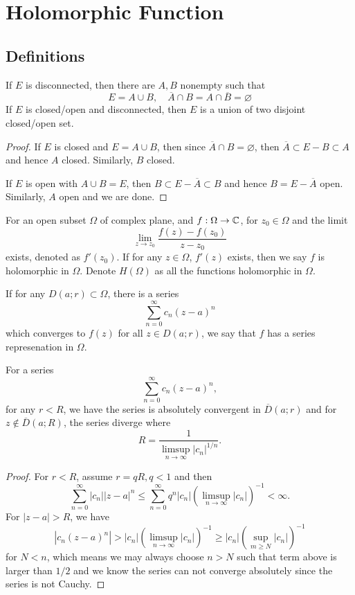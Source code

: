 \section{Holomorphic Function}

\subsection{Definitions}

\begin{definition}
    [Disconnection] If $E$ is disconnected, then there are $A,B$ nonempty such that
    \[
    E = A\cup B,\quad \overline{A} \cap B = A\cap \overline{B} = \varnothing
    \]
    If $E$ is closed/open and disconnected, then $E$ is a union of two disjoint closed/open set.
\end{definition}
\begin{proof}
    If $E$ is closed and $E = A \cup B$, then since $\overline{A} \cap B = \varnothing$, then $\overline{A} \subset E - B \subset A$ and hence $A$ closed. Similarly, $B$ closed.\par
    If $E$ is open with $A\cup B = E$, then $ B \subset E - \overline{A} \subset B$ and hence $B = E - \overline{A}$ open. Similarly, $A$ open and we are done.
\end{proof}

\begin{definition}
     For an open subset $\Omega$ of complex plane, and $f: \Omega \to \mathbb{C}$, for $z_0 \in \Omega$ and the limit
    \[
    \lim_{z\to z_0} \dfrac{f(z)-f(z_0)}{z-z_0}
    \]
    exists, denoted as $f'(z_0)$. If for any $z\in\Omega$, $f'(z)$ exists, then we say $f$ is holomorphic in $\Omega$. Denote $H(\Omega)$ as all the functions holomorphic in $\Omega$.
\end{definition}

\begin{definition}
    [Series] If for any $D(a;r) \subset \Omega$, there is a series
    \[
    \sum\limits_{n=0}^{\infty} c_n(z-a)^n
    \]
    which converges to $f(z)$ for all $z \in D(a;r)$, we say that $f$ has a series represenation in $\Omega$.
\end{definition}

\begin{theorem}
\label{thm: convergent-radius}
    For a series
    \[
    \sum\limits_{n=0}^{\infty} c_n(z-a)^n,
    \]
    for any $r < R$, we have the series is absolutely convergent in $\overline{D}(a;r)$ and for $z\notin \overline{D}(a;R)$, the series diverge where
    \[
    R = \dfrac{1}{\limsup_{n\to\infty} |c_n|^{1/n}}.
    \]
\end{theorem}
\begin{proof}
    For $r < R$, assume $r = q R, q < 1$ and then
    \[
    \sum\limits_{n=0}^{\infty} |c_n||z-a|^n \leq \sum\limits_{n = 0}^{\infty} q^n|c_n|(\limsup_{n\to\infty} |c_n|)^{-1} < \infty.
    \]
    For $|z-a| > R$, we have
    \[
    |c_n(z-a)^n| > |c_n|(\limsup_{n\to\infty} |c_n|)^{-1} \geq |c_n|(\sup_{m\geq N} |c_n|)^{-1}
    \]
    for $N < n$, which means we may always choose $n > N$ such that term above is larger than $1/2$ and we know the series can not converge absolutely since the series is not Cauchy.
\end{proof}

